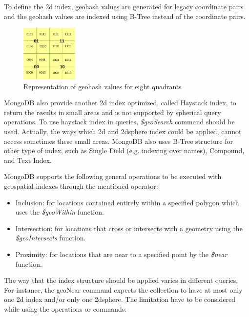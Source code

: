 \documentclass[a4paper,12pt]{article}
\begin{document}
To define the 2d index, geohash values are generated for legacy coordinate pairs and the geohash values are indexed using B-Tree instead of the coordinate pairs. 
\begin{figure}
\centering
\includegraphics[width=0.25\textwidth]{MongoIndex}
\caption{Representation of geohash values for eight quadrants}
\label{figmongoindex}
\end{figure}
MongoDB also provide another 2d index optimized, called Haystack index, to return the results in small areas and is not supported by spherical query operations. To use haystack index in queries, \textit{\$geoSearch} command should be used. Actually, the ways which 2d and 2dsphere index could be applied, cannot access sometimes these small areas. MongoDB also uses B-Tree structure for other type of index, such as Single Field (e.g. indexing over names), Compound, and Text Index. 

MongoDB supports the following general operations to be executed with geospatial indexes through the mentioned operator:
\begin{itemize}
\item Inclusion: for locations contained entirely within a specified polygon which uses the \textit{\$geoWithin} function.
\item Intersection: for locations that cross or intersects with a geometry using the
\textit{\$geoIntersects} function.
\item Proximity: for locations that are near to a specified point by the \textit{\$near}
function. 
\end{itemize}
The way that the index structure should be applied varies in different queries. For instance, the geoNear command expects the collection to have at most only one 2d index and/or only one 2dsphere. The limitation have to be considered while using the operations or commands. 
\end{document}
